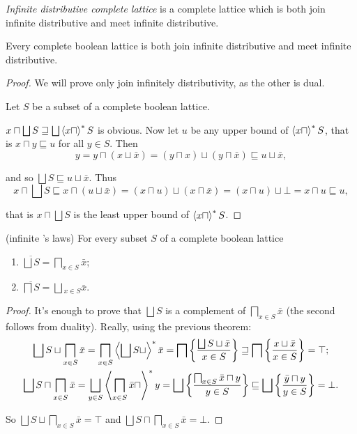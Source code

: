\begin{defn}
\emph{Infinite distributive complete
lattice} is a complete lattice which is both join infinite distributive
and meet infinite distributive.\end{defn}
\begin{thm}
Every complete boolean lattice is both join infinite distributive
and meet infinite distributive.\end{thm}
\begin{proof}
We will prove only join infinitely distributivity, as the other is
dual.

Let $S$ be a subset of a complete boolean lattice.

$x\sqcap\bigsqcup S\sqsupseteq\bigsqcup\left\langle x\sqcap\right\rangle ^{\ast}S$ is obvious.
Now let \textbf{$u$} be any upper bound of $\left\langle x\sqcap\right\rangle ^{\ast}S$,
that is $x\sqcap y\sqsubseteq u$ for all $y\in S$. Then
\[
y=y\sqcap(x\sqcup\bar{x})=(y\sqcap x)\sqcup(y\sqcap\bar{x})\sqsubseteq u\sqcup\bar{x},
\]


and so $\bigsqcup S\sqsubseteq u\sqcup\bar{x}$. Thus
\[
x\sqcap\bigsqcup S\sqsubseteq x\sqcap(u\sqcup\bar{x})=(x\sqcap u)\sqcup(x\sqcap\bar{x})=(x\sqcap u)\sqcup\bot=x\sqcap u\sqsubseteq u,
\]


that is $x\sqcap\bigsqcup S$ is the least upper bound of $\left\langle x\sqcap\right\rangle ^{\ast}S$.\end{proof}
\begin{thm}
(infinite 's laws) For
every subset $S$ of a complete boolean lattice
\begin{enumerate}
\item $\overline{\bigsqcup S}=\bigsqcap_{x\in S}\bar{x}$;
\item $\overline{\bigsqcap S}=\bigsqcup{}_{x\in S}\bar{x}$.
\end{enumerate}
\end{thm}
\begin{proof}
It's enough to prove that $\bigsqcup S$ is a complement of $\bigsqcap_{x\in S}\bar{x}$
(the second follows from duality). Really, using the previous theorem:
\begin{gather*}
\bigsqcup S\sqcup\bigsqcap_{x\in S}\bar{x}=\bigsqcap_{x\in S}\left\langle \bigsqcup S\sqcup\right\rangle ^{\ast}\bar{x}=\bigsqcap\left\{ \frac{\bigsqcup S\sqcup\bar{x}}{x\in S}\right\}\sqsupseteq\bigsqcap\left\{ \frac{x\sqcup\bar{x}}{x\in S}\right\}=\top;\\
\bigsqcup S\sqcap\bigsqcap_{x\in S}\bar{x}=\bigsqcup_{y\in S}\left\langle \bigsqcap_{x\in S}\bar{x}\sqcap\right\rangle ^{\ast}y=\bigsqcup\left\{ \frac{\bigsqcap_{x\in S}\bar{x}\sqcap y}{y\in S}\right\}\sqsubseteq\bigsqcup\left\{ \frac{\bar{y}\sqcap y}{y\in S}\right\}=\bot.
\end{gather*}


So $\bigsqcup S\sqcup\bigsqcap_{x\in S}\bar{x}=\top$ and $\bigsqcup S\sqcap\bigsqcap_{x\in S}\bar{x}=\bot$.
\end{proof}

